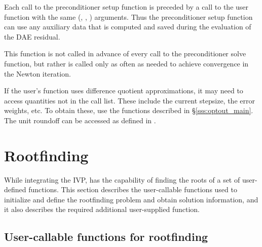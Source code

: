 {{  Each call to the preconditioner setup function is preceded by a call to the
   user function with the same (, , ) arguments.  
  Thus the preconditioner setup function can use any auxiliary data that is 
  computed and saved during the evaluation of the DAE residual.
  
  This function is not called in advance of every call to the preconditioner solve
  function, but rather is called only as often as needed to achieve convergence in
  the Newton iteration.

  If the user's  function uses difference quotient
  approximations, it may need to access quantities not in the call
  list. These include the current stepsize, the error weights, etc.
  To obtain these, use the  functions described in
  \S\ref{sss:optout_main}. The unit roundoff can be accessed
  as  defined in .

}

\section{Rootfinding}\label{s:using_rootfinding}

While integrating the IVP, {\ida} has the capability of finding the
roots of a set of user-defined functions. This section describes the
user-callable functions used to initialize and define the rootfinding
problem and obtain solution information, and it also describes the
required additional user-supplied function.

\subsection{User-callable functions for rootfinding}\label{ss:root_uc}

}
